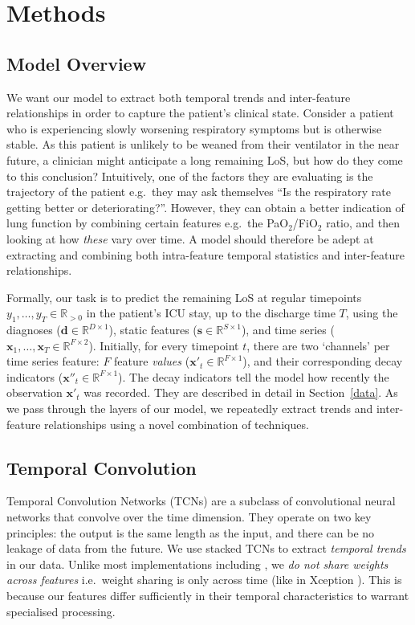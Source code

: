 \documentclass[sigconf]{acmart}
\begin{document}
\section{Methods}
\label{methods}
\subsection{Model Overview}
\label{sec:modeloverview}
We want our model to extract both temporal trends and inter-feature relationships in order to capture the patient's clinical state. Consider a patient who is experiencing slowly worsening respiratory symptoms but is otherwise stable. As this patient is unlikely to be weaned from their ventilator in the near future, a clinician might anticipate a long remaining LoS, but how do they come to this conclusion? Intuitively, one of the factors they are evaluating is the trajectory of the patient e.g.\ they may ask themselves ``Is the respiratory rate getting better or deteriorating?''. However, they can obtain a better indication of lung function by combining certain features e.g.\ the PaO$_2$/FiO$_2$ ratio, and then looking at how \emph{these} vary over time. A model should therefore be adept at extracting and combining both intra-feature temporal statistics and inter-feature relationships.

Formally, our task is to predict the remaining LoS at regular timepoints $y_1,\ldots,y_T\in\mathbb{R}_{>0}$ in the patient's ICU stay, up to the discharge time $T$, using the diagnoses ($\mathbf{d}\in\mathbb{R}^{D\times 1}$), static features ($\mathbf{s}\in\mathbb{R}^{S\times 1}$), and time series ($\mathbf{x}_1,\ldots, \mathbf{x}_T \in\mathbb{R}^{F\times 2}$). Initially, for every timepoint $t$, there are two `channels' per time series feature: $F$ feature \emph{values} ($\mathbf{x'}_t\in\mathbb{R}^{F\times 1}$), and their corresponding decay indicators ($\mathbf{x''}_t\in\mathbb{R}^{F\times 1}$). The decay indicators tell the model how recently the observation $\mathbf{x'}_t$ was recorded. They are described in detail in Section~\ref{data}. As we pass through the layers of our model, we repeatedly extract trends and inter-feature relationships using a novel combination of techniques.

\subsection{Temporal Convolution}
Temporal Convolution Networks (TCNs) \citep{Simonyan2016,DBLP:journals/corr/KalchbrennerESO16} are a subclass of convolutional neural networks \citep{Fukushima1980} that convolve over the time dimension. They operate on two key principles: the output is the same length as the input, and there can be no leakage of data from the future. We use stacked TCNs to extract \textit{temporal trends} in our data. Unlike most implementations including \cite{sontag}, we \textit{do not share weights across features} i.e.\ weight sharing is only across time (like in Xception \citep{DBLP:journals/corr/Chollet16a}). This is because our features differ sufficiently in their temporal characteristics to warrant specialised processing. 
\end{document}
